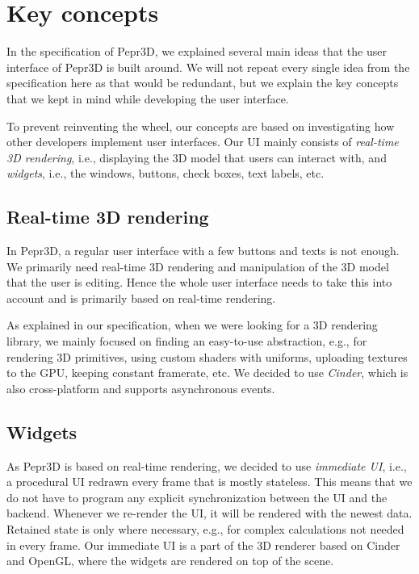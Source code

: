 \section{Key concepts}

In the specification of Pepr3D, we explained several main ideas that the user interface of Pepr3D is built around.
We will not repeat every single idea from the specification here as that would be redundant, but we explain the key concepts that we kept in mind while developing the user interface.

To prevent reinventing the wheel, our concepts are based on investigating how other developers implement user interfaces.
Our UI mainly consists of \emph{real-time 3D rendering}, i.e., displaying the 3D model that users can interact with, and \emph{widgets}, i.e., the windows, buttons, check boxes, text labels, etc.

\subsection{Real-time 3D rendering}

In Pepr3D, a regular user interface with a few buttons and texts is not enough.
We primarily need real-time 3D rendering and manipulation of the 3D model that the user is editing.
Hence the whole user interface needs to take this into account and is primarily based on real-time rendering.

As explained in our specification, when we were looking for a 3D rendering library, we mainly focused on finding an easy-to-use abstraction, e.g., for rendering 3D primitives, using custom shaders with uniforms, uploading textures to the GPU, keeping constant framerate, etc.
We decided to use \emph{Cinder}, which is also cross-platform and supports asynchronous events.

\subsection{Widgets}

As Pepr3D is based on real-time rendering, we decided to use \emph{immediate UI}, i.e., a procedural UI redrawn every frame that is mostly stateless.
This means that we do not have to program any explicit synchronization between the UI and the backend.
Whenever we re-render the UI, it will be rendered with the newest data.
Retained state is only where necessary, e.g., for complex calculations not needed in every frame.
Our immediate UI is a part of the 3D renderer based on Cinder and OpenGL, where the widgets are rendered on top of the scene.

